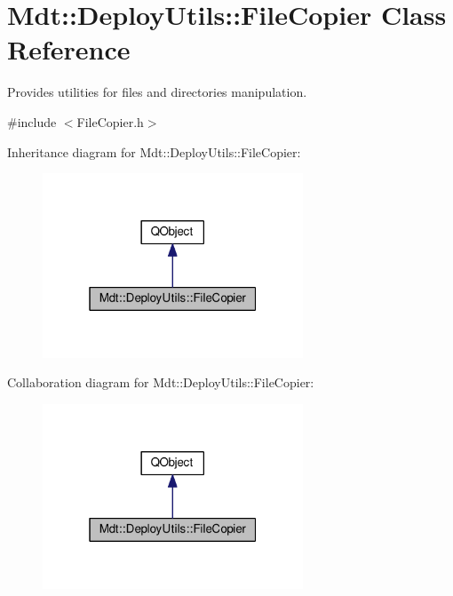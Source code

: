 \hypertarget{class_mdt_1_1_deploy_utils_1_1_file_copier}{}\section{Mdt\+:\+:Deploy\+Utils\+:\+:File\+Copier Class Reference}
\label{class_mdt_1_1_deploy_utils_1_1_file_copier}


Provides utilities for files and directories manipulation.  




{\ttfamily \#include $<$File\+Copier.\+h$>$}



Inheritance diagram for Mdt\+:\+:Deploy\+Utils\+:\+:File\+Copier\+:
\nopagebreak
\begin{figure}[H]
\begin{center}
\leavevmode
\includegraphics[width=220pt]{class_mdt_1_1_deploy_utils_1_1_file_copier__inherit__graph}
\end{center}
\end{figure}


Collaboration diagram for Mdt\+:\+:Deploy\+Utils\+:\+:File\+Copier\+:
\nopagebreak
\begin{figure}[H]
\begin{center}
\leavevmode
\includegraphics[width=220pt]{class_mdt_1_1_deploy_utils_1_1_file_copier__coll__graph}
\end{center}
\end{figure}
